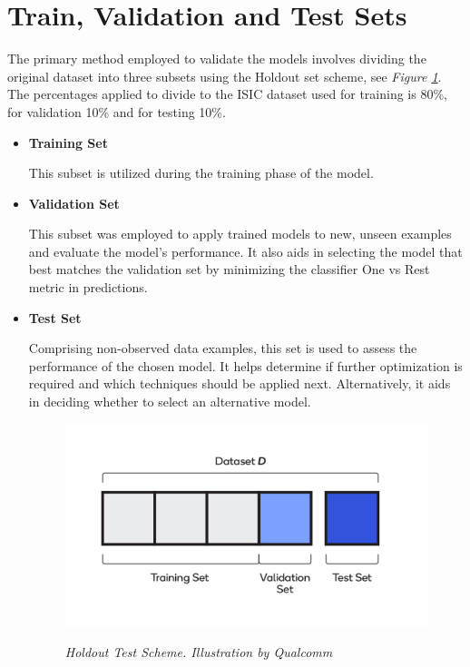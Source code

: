 \section{Train, Validation and Test Sets}

The primary method employed to validate the models involves dividing the
original dataset into three subsets using the Holdout set scheme, see
\textit{Figure \ref{fig:holdout-test-scheme}}. The percentages applied to
divide to the ISIC dataset used for training is 80\%, for validation 10\% and
for testing 10\%. \newline

\begin{itemize}

  \item \textbf{Training Set}

    This subset is utilized during the training phase of the model.

  \item \textbf{Validation Set}

    This subset was employed to apply trained models to new, unseen examples
    and evaluate the model's performance. It also aids in selecting the model
    that best matches the validation set by minimizing the classifier One vs
    Rest metric in predictions.

    \newpage

  \item \textbf{Test Set}

    Comprising non-observed data examples, this set is used to assess the
    performance of the chosen model. It helps determine if further optimization
    is required and which techniques should be applied next. Alternatively, it
    aids in deciding whether to select an alternative model.


    \begin{figure}[H]
      \centering
      \begin{adjustbox}{width=0.8\textwidth, trim={0cm 0.5cm 0cm 0.5cm}, clip}
        \includegraphics[width=\textwidth]{imatges/preliminaries/train-test-validation-sets.png}
      \end{adjustbox}
      \caption[Holdout Test Scheme]{\textit{Holdout Test Scheme. Illustration by Qualcomm}}
      {\label{fig:holdout-test-scheme}}
    \end{figure}

\end{itemize}


